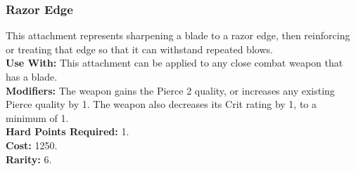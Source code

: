 \subsubsection{Razor Edge}
This attachment represents sharpening a blade to
a razor edge, then reinforcing or treating that edge
so that it can withstand repeated blows.\\
\textbf{Use With:} This attachment can be applied to any close
    combat weapon that has a blade.\\
\textbf{Modifiers:} The weapon gains the Pierce 2 quality, or
    increases any existing Pierce quality by 1. The weapon
    also decreases its Crit rating by 1, to a minimum of 1.\\
\textbf{Hard Points Required:} 1.\\
\textbf{Cost:} 1250.\\
\textbf{Rarity:} 6.\\
